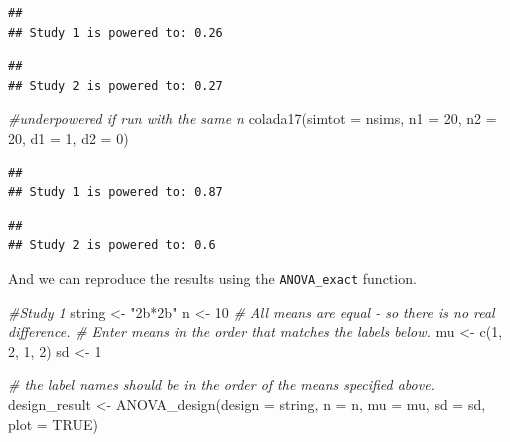 \documentclass[
]{book}
\newenvironment{Shaded}{\begin{snugshade}}{\end{snugshade}}
\newcommand{\AttributeTok}[1]{\textcolor[rgb]{0.77,0.63,0.00}{#1}}
\newcommand{\CommentTok}[1]{\textcolor[rgb]{0.56,0.35,0.01}{\textit{#1}}}
\newcommand{\ConstantTok}[1]{\textcolor[rgb]{0.00,0.00,0.00}{#1}}
\newcommand{\DecValTok}[1]{\textcolor[rgb]{0.00,0.00,0.81}{#1}}
\newcommand{\FunctionTok}[1]{\textcolor[rgb]{0.00,0.00,0.00}{#1}}
\newcommand{\NormalTok}[1]{#1}
\newcommand{\OtherTok}[1]{\textcolor[rgb]{0.56,0.35,0.01}{#1}}
\newcommand{\StringTok}[1]{\textcolor[rgb]{0.31,0.60,0.02}{#1}}
\begin{document}
\begin{verbatim}
## 
## Study 1 is powered to: 0.26
\end{verbatim}

\begin{verbatim}
## 
## Study 2 is powered to: 0.27
\end{verbatim}

\begin{Shaded}
\begin{Highlighting}[]
\CommentTok{\#underpowered if run with the same n}
\FunctionTok{colada17}\NormalTok{(}\AttributeTok{simtot =}\NormalTok{ nsims, }\AttributeTok{n1 =} \DecValTok{20}\NormalTok{, }\AttributeTok{n2 =} \DecValTok{20}\NormalTok{, }\AttributeTok{d1 =} \DecValTok{1}\NormalTok{, }\AttributeTok{d2 =} \DecValTok{0}\NormalTok{)  }
\end{Highlighting}
\end{Shaded}

\begin{verbatim}
## 
## Study 1 is powered to: 0.87
\end{verbatim}

\begin{verbatim}
## 
## Study 2 is powered to: 0.6
\end{verbatim}

And we can reproduce the results using the \texttt{ANOVA\_exact} function.

\begin{Shaded}
\begin{Highlighting}[]
\CommentTok{\#Study 1}
\NormalTok{string }\OtherTok{\textless{}{-}} \StringTok{"2b*2b"}
\NormalTok{n }\OtherTok{\textless{}{-}} \DecValTok{10}
\CommentTok{\# All means are equal {-} so there is no real difference.}
\CommentTok{\# Enter means in the order that matches the labels below.}
\NormalTok{mu }\OtherTok{\textless{}{-}} \FunctionTok{c}\NormalTok{(}\DecValTok{1}\NormalTok{, }\DecValTok{2}\NormalTok{, }\DecValTok{1}\NormalTok{, }\DecValTok{2}\NormalTok{) }
\NormalTok{sd }\OtherTok{\textless{}{-}} \DecValTok{1}

\CommentTok{\# the label names should be in the order of the means specified above.}
\NormalTok{design\_result }\OtherTok{\textless{}{-}} \FunctionTok{ANOVA\_design}\NormalTok{(}\AttributeTok{design =}\NormalTok{ string,}
                   \AttributeTok{n =}\NormalTok{ n, }
                   \AttributeTok{mu =}\NormalTok{ mu, }
                   \AttributeTok{sd =}\NormalTok{ sd, }
                   \AttributeTok{plot =} \ConstantTok{TRUE}\NormalTok{)}
\end{Highlighting}
\end{Shaded}
\end{document}
